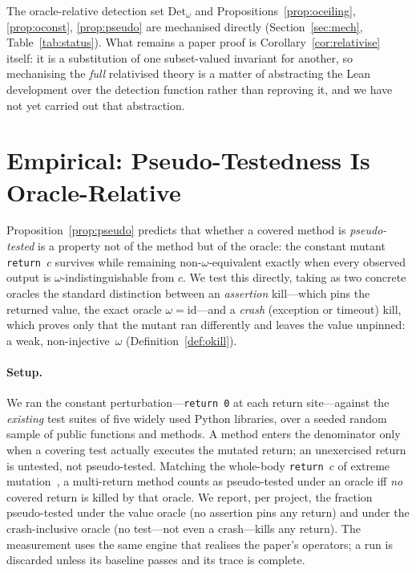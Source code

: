 \documentclass[runningheads,envcountsect,envcountsame]{llncs}
\newcommand{\DetW}{\mathrm{Det}_{\omega}}
\begin{document}
\begin{remark}[status]
\label{rem:ostatus}
The oracle-relative detection set $\DetW$ and Propositions~\ref{prop:oceiling},
\ref{prop:oconst}, \ref{prop:pseudo} are mechanised directly (Section~\ref{sec:mech},
Table~\ref{tab:status}). What remains a paper proof is
Corollary~\ref{cor:relativise} itself: it is a substitution of one subset-valued
invariant for another, so mechanising the \emph{full} relativised theory is a matter of
abstracting the Lean development over the detection function rather than reproving it, and
we have not yet carried out that abstraction.
\end{remark}

\section{Empirical: Pseudo-Testedness Is Oracle-Relative}
\label{sec:empirical}

Proposition~\ref{prop:pseudo} predicts that whether a covered method is
\emph{pseudo-tested} is a property not of the method but of the oracle: the
constant mutant \texttt{return\,$c$} survives while remaining
non-$\omega$-equivalent exactly when every observed output is
$\omega$-indistinguishable from $c$. We test this directly, taking as two concrete
oracles the standard distinction between an \emph{assertion} kill---which pins the
returned value, the exact oracle $\omega = \mathrm{id}$---and a \emph{crash}
(exception or timeout) kill, which proves only that the mutant ran differently and
leaves the value unpinned: a weak, non-injective~$\omega$
(Definition~\ref{def:okill}).

\paragraph{Setup.}
We ran the constant perturbation---\texttt{return\,0} at each return site---against
the \emph{existing} test suites of five widely used Python libraries, over a seeded
random sample of public functions and methods. A method enters the denominator only
when a covering test actually executes the mutated return; an unexercised return is
untested, not pseudo-tested. Matching the whole-body \texttt{return\,$c$} of extreme
mutation~\cite{niedermayr2016,veraperez2018}, a multi-return method counts as
pseudo-tested under an oracle iff \emph{no} covered return is killed by that oracle.
We report, per project, the fraction pseudo-tested under the value oracle (no
assertion pins any return) and under the crash-inclusive oracle (no test---not even
a crash---kills any return). The measurement uses the same engine that realises the
paper's operators; a run is discarded unless its baseline passes and its trace is
complete.
\end{document}
